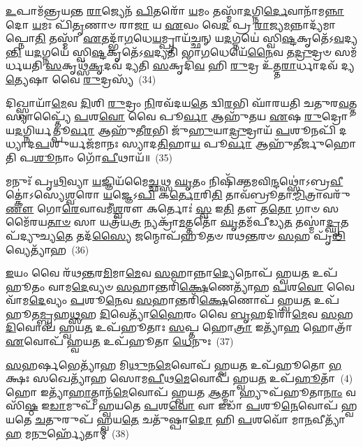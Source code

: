 \-\ul{𑌉}\-𑌪𑌾𑌮᳴𑌨𑍍𑌤𑍍𑌰𑌯𑌨𑍍𑌤 \ul{𑌰𑌾}\-𑌜𑍍𑌯𑍇𑌨᳴ \ul{𑌪𑌿}\-𑌤𑌰𑍋᳴ \ul{𑌯}\-𑌮𑌂 𑌤𑌸𑍍𑌮𑌾᳴\-\ul{𑌦}\-𑌗𑍍𑌨𑌿\-\ul{𑌰𑍍𑌦𑍇}\-𑌵𑌾𑌨𑌾᳴𑌮\-\ul{𑌨𑍍𑌨𑌾}\-𑌦𑍋 \ul{𑌯}\-𑌮𑌃 𑌪𑌿᳴\-\ul{𑌤𑍃}\-𑌣𑌾𑍞 𑌰𑌾\-\ul{𑌜𑌾} 𑌯 \ul{𑌏}\-𑌵𑌂 𑌵𑍇\-\ul{𑌦} 𑌪𑍍𑌰 \ul{𑌰𑌾}\-𑌜𑍍𑌯\-\ul{𑌮}\-𑌨𑍍𑌨𑌾𑌦𑍍𑌯᳴𑌮𑌾𑌪𑍍𑌨𑍋\-\ul{𑌤𑌿} 𑌤𑌸𑍍𑌮𑌾᳴ \ul{𑌏}\-𑌤𑌦𑍍𑌭𑌾᳴\-\ul{𑌗}\-𑌧𑍇\-\ul{𑌯}\-𑌮𑍍𑌪𑍍𑌰𑌾𑌯᳴\-\ul{𑌚𑍍𑌛}\-𑌨𑍍 𑌯\-\ul{𑌦}\-𑌗𑍍𑌨𑌯𑍇॑ 𑌸𑍍𑌵𑌿\-\ul{𑌷𑍍𑌟}\-𑌕𑍃𑌤𑍇᳴\-𑌽\-\ul{𑌵}\-𑌦𑍍𑌯\-\ul{𑌨𑍍𑌤𑌿} 𑌯\-\ul{𑌦}\-𑌗𑍍𑌨𑌯𑍇॑ 𑌸𑍍𑌵𑌿\-\ul{𑌷𑍍𑌟}\-𑌕𑍃𑌤𑍇᳴\-𑌽\-\ul{𑌵}\-𑌦𑍍𑌯𑌤𑌿᳴ 𑌭𑌾\-\ul{𑌗}\-𑌧𑍇𑌯𑍇᳴\-\ul{𑌨𑍈}\-𑌵 𑌤\-\ul{𑌦𑍍𑌰𑍁}\-𑌦𑍍𑌰𑍞 𑌸𑌮᳴𑌰𑍍𑌧𑌯𑌤𑌿 \ul{𑌸}\-𑌕𑍃𑌥𑍍𑌸᳴\-\ul{𑌕𑍃}\-𑌦𑌵᳴ 𑌦𑍍𑌯𑌤𑌿 \ul{𑌸}\-𑌕𑍃𑌦𑌿᳴\-\ul{𑌵} 𑌹𑌿 \ul{𑌰𑍁}\-𑌦𑍍𑌰 𑌉᳴𑌤𑍍𑌤\-\ul{𑌰𑌾}\-𑌰𑍍𑌧𑌾𑌦𑌵᳴ 𑌦𑍍𑌯\-\ul{𑌤𑍍𑌯𑍇}\-𑌷𑌾 𑌵𑍈 \ul{𑌰𑍁}\-𑌦𑍍𑌰𑌸𑍍𑌯᳴~(34)

𑌦𑌿𑌖𑍍𑌸𑍍𑌵𑌾𑌯𑌾᳴\-\ul{𑌮𑍇}\-𑌵 \ul{𑌦𑌿}\-𑌶𑌿 \ul{𑌰𑍁}\-𑌦𑍍𑌰𑌂 \ul{𑌨𑌿}\-𑌰𑌵᳴𑌦𑌯\-\ul{𑌤𑍇} 𑌦𑍍𑌵𑌿\-\ul{𑌰}\-𑌭𑌿 𑌘𑌾᳴𑌰𑌯𑌤𑌿 𑌚𑌤𑍁𑌰\-\ul{𑌵}\-𑌤𑍍𑌤𑌸𑍍𑌯𑌾𑌪𑍍𑌤𑍍𑌯𑍈᳴ \ul{𑌪}\-𑌶\-\ul{𑌵𑍋} 𑌵𑍈 𑌪𑍂\-\ul{𑌰𑍍𑌵𑌾} 𑌆𑌹𑍁᳴𑌤𑌯 \ul{𑌏}\-𑌷 \ul{𑌰𑍁}\-𑌦𑍍𑌰𑍋 𑌯\-\ul{𑌦}\-𑌗𑍍𑌨𑌿𑌰𑍍𑌯𑌤𑍍𑌪𑍂\-\ul{𑌰𑍍𑌵𑌾} 𑌆𑌹𑍁᳴𑌤𑍀\-\ul{𑌰}\-𑌭𑌿 𑌜𑍁᳴\-\ul{𑌹𑍁}\-𑌯𑌾\-\ul{𑌦𑍍𑌰𑍁}\-𑌦𑍍𑌰𑌾𑌯᳴ \ul{𑌪}\-𑌶𑍂𑌨𑌪𑌿᳴ 𑌦𑌧𑍍𑌯𑌾𑌦\-\ul{𑌪}\-𑌶𑍁𑌰𑍍𑌯𑌜᳴𑌮𑌾𑌨𑌃 𑌸𑍍𑌯𑌾𑌦\-\ul{𑌤𑌿}\-𑌹𑌾\-\ul{𑌯} 𑌪𑍂\-\ul{𑌰𑍍𑌵𑌾} 𑌆𑌹𑍁᳴𑌤𑍀𑌰𑍍𑌜𑍁𑌹𑍋𑌤𑌿 𑌪\-\ul{𑌶𑍂}\-𑌨𑌾𑌂 𑌗𑍋᳴\-\ul{𑌪𑍀}\-𑌥𑌾𑌯᳴॥~(35)

{\anuvakamend[{\-\ul{𑌶}\-𑌪𑍍𑌤𑌃 𑌸𑍍𑌪᳴𑌰𑍍𑌶𑌯𑌤𑌿 \ul{𑌭𑍂}\-𑌤𑌾𑌨𑌾᳴\-\ul{𑌮}\-𑌗𑍍𑌨𑌿𑍞 \ul{𑌰𑍁}\-𑌦𑍍𑌰𑌸𑍍𑌯᳴ \ul{𑌸}\-𑌪𑍍𑌤𑌤𑍍𑌰𑌿𑍞᳴𑌶𑌚𑍍𑌚}]}%

𑌮𑌨𑍁𑌃᳴ 𑌪𑍃\-\ul{𑌥𑌿}\-𑌵𑍍𑌯𑌾 \ul{𑌯}\-𑌜𑍍𑌞𑌿𑌯᳴𑌮𑍈\-\ul{𑌚𑍍𑌛}\-𑌥𑍍𑌸 \ul{𑌘𑍃}\-𑌤𑌂 𑌨𑌿𑌷𑌿᳴𑌕𑍍𑌤𑌮𑌵𑌿\-\ul{𑌨𑍍𑌦}\-𑌥𑍍𑌸𑍋॑\-𑌽𑌬𑍍𑌰\-\ul{𑌵𑍀}\-𑌤𑍍𑌕𑍋॑\-𑌽𑌸𑍍𑌯𑍇\-\ul{𑌶𑍍𑌵}\-𑌰𑍋 \ul{𑌯}\-𑌜𑍍𑌞𑍇\-𑌽\-\ul{𑌪𑌿} 𑌕\-\ul{𑌰𑍍𑌤𑍋}\-𑌰𑌿\-\ul{𑌤𑌿} 𑌤𑌾𑌵᳴𑌬𑍍𑌰𑍂𑌤𑌾\-\ul{𑌮𑍍𑌮𑌿}\-𑌤𑍍𑌰𑌾𑌵𑌰𑍁᳴\-\ul{𑌣𑍗} 𑌗𑍋\-\ul{𑌰𑍇}\-𑌵𑌾𑌵𑌮𑍀॑\-\ul{𑌶𑍍𑌵}\-𑌰𑍗 𑌕𑌰𑍍𑌤𑍋𑌃॑ \ul{𑌸𑍍𑌵} 𑌇\-\ul{𑌤𑌿} 𑌤𑍗 𑌤\-\ul{𑌤𑍋} 𑌗𑌾𑍞 𑌸𑌮𑍈᳴𑌰𑌯\-\ul{𑌤𑌾}\-\-\ul{𑍞} 𑌸𑌾 𑌯𑌤𑍍𑌰᳴𑌯\-\ul{𑌤𑍍𑌰} 𑌨𑍍𑌯𑌕𑍍𑌰𑌾᳴\-\ul{𑌮}\-𑌤𑍍𑌤𑌤𑍋᳴ \ul{𑌘𑍃}\-𑌤𑌮᳴𑌪𑍀𑌡𑍍𑌯\-\ul{𑌤} 𑌤𑌸𑍍𑌮𑌾॑\-\ul{𑌦𑍍𑌘𑍃}\-𑌤𑌪᳴𑌦𑍍𑌯𑍁𑌚𑍍𑌯\-\ul{𑌤𑍇} 𑌤𑌦᳴\-\ul{𑌸𑍍𑌯𑍈} 𑌜𑌨𑍍𑌮𑍋𑌪᳴𑌹𑍂𑌤𑍞 𑌰𑌥\-\ul{𑌨𑍍𑌤}\-𑌰𑍞 \ul{𑌸}\-𑌹 𑌪𑍃᳴\-\ul{𑌥𑌿}\-𑌵𑍍𑌯𑍇𑌤𑍍𑌯𑌾᳴𑌹~(36)

\-\ul{𑌇}\-𑌯𑌂 𑌵𑍈 𑌰᳴𑌥\-\ul{𑌨𑍍𑌤}\-𑌰\-\ul{𑌮𑌿}\-𑌮𑌾\-\ul{𑌮𑍇}\-𑌵 \ul{𑌸}\-𑌹𑌾𑌨𑍍𑌨𑌾\-\ul{𑌦𑍍𑌯𑍇}\-𑌨𑍋𑌪᳴ 𑌹𑍍𑌵𑌯\-\ul{𑌤} 𑌉𑌪᳴𑌹𑍂𑌤𑌂 𑌵𑌾𑌮\-\ul{𑌦𑍇}\-𑌵𑍍𑌯𑍞 \ul{𑌸}\-𑌹𑌾𑌨𑍍𑌤𑌰𑌿᳴\-\ul{𑌕𑍍𑌷𑍇}\-𑌣𑍇𑌤𑍍𑌯𑌾᳴𑌹 \ul{𑌪}\-𑌶\-\ul{𑌵𑍋} 𑌵𑍈 𑌵𑌾᳴𑌮\-\ul{𑌦𑍇}\-𑌵𑍍𑌯𑌂 \ul{𑌪}\-𑌶𑍂\-\ul{𑌨𑍇}\-𑌵 \ul{𑌸}\-𑌹𑌾𑌨𑍍𑌤𑌰𑌿᳴\-\ul{𑌕𑍍𑌷𑍇}\-𑌣𑍋𑌪᳴ 𑌹𑍍𑌵𑌯\-\ul{𑌤} 𑌉𑌪᳴𑌹𑍂𑌤\-\ul{𑌮𑍍𑌬𑍃}\-𑌹\-\ul{𑌥𑍍𑌸}\-𑌹 \ul{𑌦𑌿}\-𑌵𑍇𑌤𑍍𑌯𑌾᳴\-\ul{𑌹𑍈}\-𑌰𑌂 𑌵𑍈 \ul{𑌬𑍃}\-𑌹𑌦𑌿𑌰𑌾᳴\-\ul{𑌮𑍇}\-𑌵 \ul{𑌸}\-𑌹 \ul{𑌦𑌿}\-𑌵𑍋𑌪᳴ 𑌹𑍍𑌵𑌯\-\ul{𑌤} 𑌉𑌪᳴𑌹𑍂𑌤𑌾𑌃 \ul{𑌸}\-𑌪𑍍𑌤 𑌹𑍋\-\ul{𑌤𑍍𑌰𑌾} 𑌇𑌤𑍍𑌯𑌾᳴\-\ul{𑌹} 𑌹𑍋𑌤𑍍𑌰𑌾᳴ \ul{𑌏}\-𑌵𑍋𑌪᳴ 𑌹𑍍𑌵𑌯\-\ul{𑌤} 𑌉𑌪᳴𑌹𑍂𑌤𑌾 \ul{𑌧𑍇}\-𑌨𑍁𑌃~(37)

\-\ul{𑌸}\-𑌹𑌰𑍍\mbox{}\-\ul{𑌷}\-𑌭𑍇𑌤𑍍𑌯𑌾᳴𑌹 𑌮𑌿\-\ul{𑌥𑍁}\-𑌨\-\ul{𑌮𑍇}\-𑌵𑍋𑌪᳴ 𑌹𑍍𑌵𑌯\-\ul{𑌤} 𑌉𑌪᳴𑌹𑍂𑌤𑍋 \ul{𑌭}\-𑌕𑍍𑌷𑌃 𑌸𑌖𑍇𑌤𑍍𑌯𑌾᳴𑌹 𑌸𑍋𑌮\-\ul{𑌪𑍀}\-𑌥\-\ul{𑌮𑍇}\-𑌵𑍋𑌪᳴ 𑌹𑍍𑌵𑌯\-\ul{𑌤} 𑌉𑌪᳴\-\ul{𑌹𑍂}\-𑌤𑌾𑌁~(4) 𑌹𑍋 𑌇𑌤𑍍𑌯𑌾᳴\-\ul{𑌹𑌾}\-𑌤𑍍𑌮𑌾𑌨᳴\-\ul{𑌮𑍇}\-𑌵𑍋𑌪᳴ 𑌹𑍍𑌵𑌯𑌤 \ul{𑌆}\-𑌤𑍍𑌮𑌾 𑌹𑍍𑌯𑍁𑌪᳴𑌹𑍂𑌤𑌾\-\ul{𑌨𑌾𑌂} 𑌵𑌸𑌿᳴\-\ul{𑌷𑍍𑌠} 𑌇\-\ul{𑌡𑌾}\-𑌮𑍁𑌪᳴ 𑌹𑍍𑌵𑌯𑌤𑍇 \ul{𑌪}\-𑌶\-\ul{𑌵𑍋} 𑌵𑌾 𑌇𑌡𑌾᳴ \ul{𑌪}\-𑌶𑍂\-\ul{𑌨𑍇}\-𑌵𑍋𑌪᳴ 𑌹𑍍𑌵𑌯𑌤𑍇 \ul{𑌚}\-𑌤𑍁𑌰𑍁𑌪᳴ 𑌹𑍍𑌵𑌯\-\ul{𑌤𑍇} 𑌚𑌤𑍁᳴𑌷𑍍𑌪𑌾\-\ul{𑌦𑍋} 𑌹𑌿 \ul{𑌪}\-𑌶𑌵𑍋᳴ 𑌮𑌾\-\ul{𑌨}\-𑌵𑍀𑌤𑍍𑌯𑌾᳴\-\ul{𑌹} 𑌮\-\ul{𑌨𑍁}\-𑌰𑍍\mbox{}𑌹𑍍𑌯𑍇᳴𑌤𑌾𑌮𑍍~(38)

